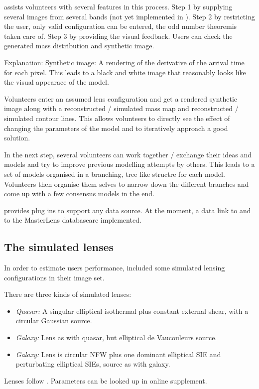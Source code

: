 \spl assists volunteers with several features in this process.
Step 1 by supplying several images from several bands (not yet implemented in \sw).
Step 2 by restricting the user, only valid configuration can be entered, the odd number theorem\needcite is taken care of.
Step 3 by providing the visual feedback. Users can check the generated mass distribution and synthetic image.

Explanation:
Synthetic image: A rendering of the derivative of the arrival time for each pixel. This leads to a black and white image that reasonably looks like the visual appearace of the model.

Volunteers enter an assumed lens configuration and get a rendered synthetic image along with a reconstructed / simulated mass map and reconstructed / simulated contour lines.
This allows volunteers to directly see the effect of changing the parameters of the model and to iteratively approach a good solution.

In the next step, several volunteers can work together / exchange their ideas and models and try to improve previous modelling attempts by others.
This leads to a set of models organised in a branching, tree like structre for each model.
Volunteers then organise them selves to narrow down the different branches and come up with a few consensus models in the end.

\spl provides plug ins to support any data source. At the moment, a data link to \sw and to the MasterLens database\needcite are implemented.






\subsection{The simulated lenses} \label{sec:sims}

In order to estimate users performance, \sw included some simulated lensing configurations in their image set.

There are three kinds of simulated lenses:

\begin{itemize}
  \item {\em Quasar:\/} A singular elliptical isothermal plus constant
    external shear, with a circular Gaussian source.
  \item {\em Galaxy:\/} Lens as with quasar, but elliptical de
    Vaucouleurs source.
  \item {\em Galaxy:\/} Lens is circular NFW plus one dominant
    elliptical SIE and perturbating elliptical SIEs, source as with
    galaxy.
\end{itemize}
Lenses follow \cite{2001astro.ph..2341K,2001astro.ph..2340K}.
Parameters can be looked up in online supplement.


